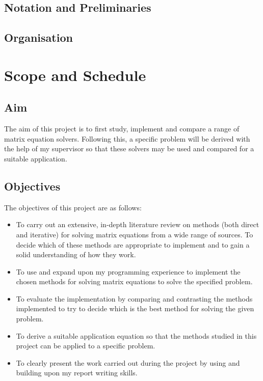 \documentclass{article}
\numberwithin{equation}{section}
\begin{document}
\subsection{Notation and Preliminaries}

\subsection{Organisation}

\newpage

\section{Scope and Schedule}
\subsection{Aim}
The aim of this project is to first study, implement and compare a range of matrix equation solvers. Following this, a specific problem will be derived with the help of my supervisor so that these solvers may be used and compared for a suitable application.

\subsection{Objectives}
The objectives of this project are as follows:
\begin{itemize}
\item To carry out an extensive, in-depth literature review on methods (both direct and iterative) for solving matrix equations from a wide range of sources. To decide which of these methods are appropriate to implement and to gain a solid understanding of how they work. 
\item To use and expand upon my programming experience to implement the chosen methods for solving matrix equations to solve the specified problem. 
\item To evaluate the implementation by comparing and contrasting the methods implemented to try to decide which is the best method for solving the given problem.
\item To derive a suitable application equation so that the methods studied in this project can be applied to a specific problem. 
\item To clearly present the work carried out during the project by using and building upon my report writing skills.
\end{itemize}
\end{document}
